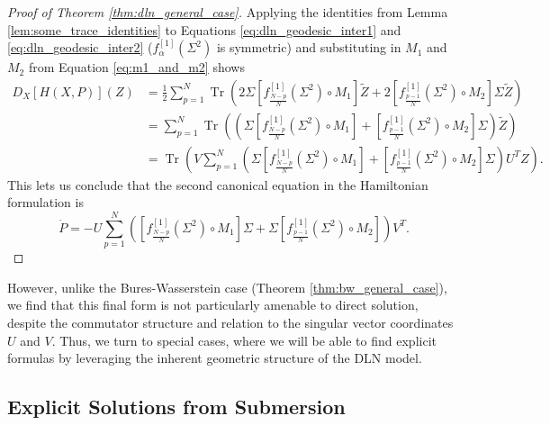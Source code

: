 \documentclass{amsart}
\DeclareMathOperator{\Tr}{Tr}
\theoremstyle{definition}
\theoremstyle{remark}
\numberwithin{equation}{section}
\begin{document}
\begin{proof}[Proof of Theorem \ref{thm:dln_general_case}]
Applying the identities from Lemma \ref{lem:some_trace_identities} to Equations \ref{eq:dln_geodesic_inter1} and \ref{eq:dln_geodesic_inter2} ($f^{[1]}_{\alpha}(\Sigma^2)$ is symmetric) and substituting in $M_1$ and $M_2$ from Equation \ref{eq:m1_and_m2} shows
\begin{align}
    D_X[H(X,P)](Z) &= \frac{1}{2}\sum_{p=1}^N \Tr\left(2\Sigma \left[f_{\frac{N-p}{N}}^{[1]}\left(\Sigma^2\right) \circ M_1\right]\tilde{Z} + 2\left[f_\frac{p-1}{N}^{[1]}\left(\Sigma^2\right) \circ M_2\right]\Sigma\tilde{Z}\right) \\
    &= \sum_{p=1}^N \Tr\left(\left(\Sigma \left[f_{\frac{N-p}{N}}^{[1]}\left(\Sigma^2\right) \circ M_1\right] + \left[f_\frac{p-1}{N}^{[1]}\left(\Sigma^2\right) \circ M_2\right]\Sigma\right)\tilde{Z}\right)\\
    &= \Tr\left(V\sum_{p=1}^N \left(\Sigma \left[f_{\frac{N-p}{N}}^{[1]}\left(\Sigma^2\right) \circ M_1\right] + \left[f_\frac{p-1}{N}^{[1]}\left(\Sigma^2\right) \circ M_2\right]\Sigma\right)U^T Z\right).
\end{align}
This lets us conclude that the second canonical equation in the Hamiltonian formulation is 
\begin{equation}
    \dot{P} = -U \sum_{p=1}^N \left(\left[f_{\frac{N-p}{N}}^{[1]}\left(\Sigma^2\right) \circ M_1\right] \Sigma + \Sigma\left[f_\frac{p-1}{N}^{[1]}\left(\Sigma^2\right) \circ M_2\right]\right) V^T.
\end{equation}
\end{proof}
However, unlike the Bures-Wasserstein case (Theorem \ref{thm:bw_general_case}), we find that this final form is not particularly amenable to direct solution, despite the commutator structure and relation to the singular vector coordinates $U$ and $V$. Thus, we turn to special cases, where we will be able to find explicit formulas by leveraging the inherent geometric structure of the DLN model.

\subsection{Explicit Solutions from Submersion}\label{sec:dln_special_case_geodesics_proof}
\end{document}
